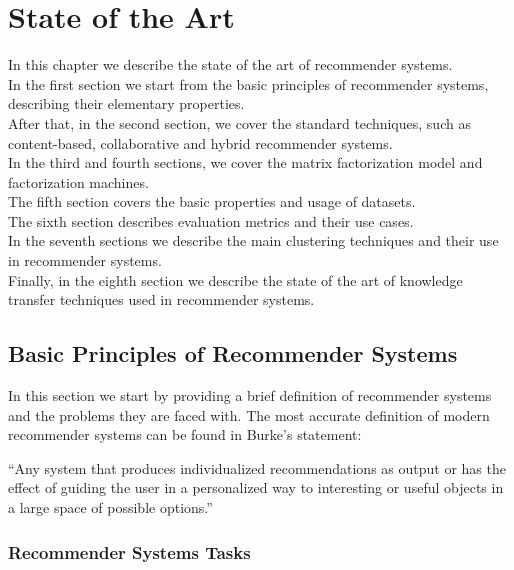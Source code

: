 \chapter{State of the Art}
\label{ch:state-of-the-art}

In this chapter we describe the state of the art of recommender systems.\\
In the first section we start from the basic principles of recommender systems, describing their elementary properties.\\
After that, in the second section, we cover the standard techniques, such as content-based, collaborative and hybrid recommender systems.\\
In the third and fourth sections, we cover the matrix factorization model and factorization machines.\\
The fifth section covers the basic properties and usage of datasets.\\
The sixth section describes evaluation metrics and their use cases.\\
In the seventh sections we describe the main clustering techniques and their use in recommender systems.\\
Finally, in the eighth section we describe the state of the art of knowledge transfer techniques used in recommender systems.



\section{Basic Principles of Recommender Systems}

In this section we start by providing a brief definition of recommender systems and the problems they are faced with.
The most accurate definition of modern recommender systems can be found in Burke's statement:
\begin{displayquote}
\enquote{Any system that produces individualized recommendations as output or has the effect of guiding the user in a personalized way to interesting or useful objects in a large space of possible options.}
\end{displayquote}


\subsection{Recommender Systems Tasks}

